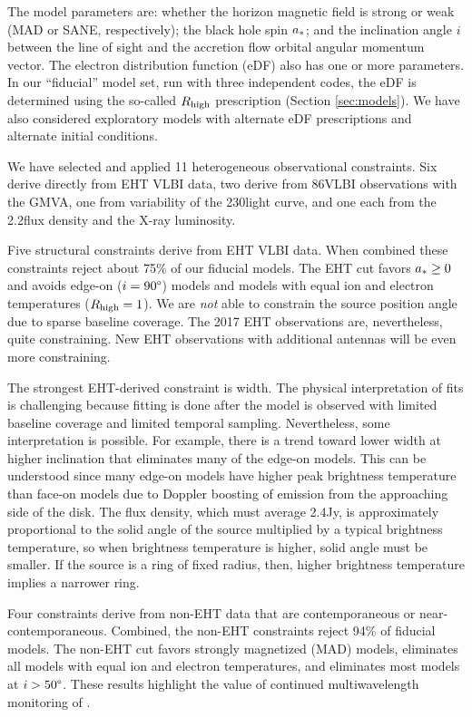 The model parameters are: whether the horizon magnetic field is strong or weak (MAD or SANE, respectively); the black hole spin $a_*$; and the inclination angle $i$ between the line of sight and the accretion flow orbital angular momentum vector.
The electron distribution function (eDF) also has one or more parameters.
In our ``fiducial'' model set, run with three independent codes, the eDF is determined using the so-called $R_\mathrm{high}$ prescription (Section \ref{sec:models}).
We have also considered exploratory models with alternate eDF prescriptions and alternate initial conditions.

We have selected and applied 11 heterogeneous observational constraints.
Six derive directly from EHT VLBI data, two derive from 86\GHz VLBI observations with the GMVA, one from variability of the 230\GHz light curve, and one each from the 2.2\um flux density and the X-ray luminosity.

Five structural constraints derive from EHT VLBI data.
When combined these constraints reject about 75\% of our fiducial models.
The EHT cut favors $a_* \ge 0$ and avoids edge-on ($i = 90\degree$) models and models with equal ion and electron temperatures ($R_\mathrm{high} = 1$).
We are {\em not} able to constrain the source position angle due to sparse baseline coverage.
The 2017 EHT observations are, nevertheless, quite constraining.  New EHT observations with additional antennas will be even more constraining.

The strongest EHT-derived constraint is \mring width.  The physical interpretation of \mring fits is challenging because fitting is done after the model is observed with limited baseline coverage and limited temporal sampling.  Nevertheless, some interpretation is possible.  For example, there is a trend toward lower width at higher inclination that eliminates many of the edge-on models. This can be understood since many edge-on models have higher peak brightness temperature than face-on models due to Doppler boosting of emission from the approaching side of the disk. The flux density, which must average 2.4Jy, is approximately proportional to the solid angle of the source multiplied by a typical brightness temperature, so when brightness temperature is higher, solid angle must be smaller.  If the source is a ring of fixed radius, then, higher brightness temperature implies a narrower ring. 

Four constraints derive from non-EHT data that are contemporaneous or near-contemporaneous.
Combined, the non-EHT constraints reject 94\% of fiducial models.
The non-EHT cut favors strongly magnetized (MAD) models, eliminates all models with equal ion and electron temperatures, and eliminates most models at $i > 50\degree$.
These results highlight the value of continued multiwavelength monitoring of \sgra.

